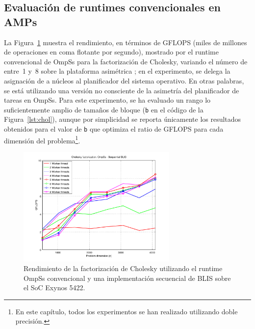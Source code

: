 \subsection{Evaluación de runtimes convencionales en AMPs}
\label{subsec:conv_eval}

La Figura~\ref{fig:ompss_blis_oversubscription} muestra el rendimiento, en términos de GFLOPS (miles de millones de
operaciones en coma flotante por segundo), mostrado por el runtime convencional de OmpSs para la factorización
de Cholesky, variando el número de \wts entre~1 y~8 sobre la plataforma asimétrica \odroid; en el 
experimento, se delega la asignación de \wts a núcleos al planificador del sistema operativo. En otras palabras,
se está utilizando una versión no consciente de la asimetría del planificador de tareas en OmpSs.
Para este experimento, se ha evaluado un rango lo suficientemente amplio de tamaños de bloque 
({\tt b} en el código de la Figura~\ref{lst:chol}), aunque por simplicidad se reporta únicamente los
resultados obtenidos para el valor de {\tt b} que optimiza el ratio de GFLOPS para cada dimensión
del problema\footnote{En este capítulo, todos los experimentos se han realizado utilizando doble precisión.}.

\begin{figure}
\centering
\includegraphics[width=0.70\textwidth]{Plots/Orig_runtime/plot_1to8_th}
\caption{Rendimiento de la factorización de Cholesky utilizando el runtime OmpSs convencional y una implementación secuencial
	de BLIS sobre el SoC Exynos 5422.}
\label{fig:ompss_blis_oversubscription}
\end{figure}


